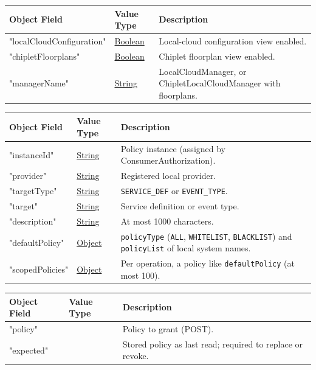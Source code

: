 \documentclass[a4paper]{arrowhead}
\newcommand{\mref}[2][]{{\textcolor{ArrowheadPurple}{\hyperref[sec:model:#2]{\ifstrempty{#1}{#2}{#1}}}}}
\newcommand{\pref}[1]{{\textcolor{ArrowheadGrey}{\hyperref[sec:model:primitives:#1]{#1}}}}
\begin{document}

\noindent\begin{tabularx}{\textwidth}{| >{\raggedright\arraybackslash}p{3.9cm} | >{\raggedright\arraybackslash\small}p{5.3cm} | X |} \hline
\rowcolor{gray!33} Object Field & Value Type & Description \\ \hline
"localCloudConfiguration" & \pref{Boolean} & Local-cloud configuration view enabled. \\ \hline
"chipletFloorplans" & \pref{Boolean} & Chiplet floorplan view enabled. \\ \hline
"managerName" & \pref{String} & LocalCloudManager, or ChipletLocalCloudManager with floorplans. \\ \hline
\end{tabularx}



\noindent\begin{tabularx}{\textwidth}{| >{\raggedright\arraybackslash}p{3.9cm} | >{\raggedright\arraybackslash\small}p{5.3cm} | X |} \hline
\rowcolor{gray!33} Object Field & Value Type & Description \\ \hline
"instanceId" & \pref{String} & Policy instance (assigned by Consumer\allowbreak{}Authorization). \\ \hline
"provider" & \pref{String} & Registered local provider. \\ \hline
"targetType" & \pref{String} & \texttt{SERVICE\_DEF} or \texttt{EVENT\_TYPE}. \\ \hline
"target" & \pref{String} & Service definition or event type. \\ \hline
"description" & \pref{String} & At most 1000 characters. \\ \hline
"defaultPolicy" & \pref{Object} & \texttt{policyType} (\texttt{ALL}, \texttt{WHITELIST}, \texttt{BLACKLIST}) and \texttt{policyList} of local system names. \\ \hline
"scopedPolicies" & \pref{Object} & Per operation, a policy like \texttt{defaultPolicy} (at most 100). \\ \hline
\end{tabularx}



\noindent\begin{tabularx}{\textwidth}{| >{\raggedright\arraybackslash}p{3.9cm} | >{\raggedright\arraybackslash\small}p{5.3cm} | X |} \hline
\rowcolor{gray!33} Object Field & Value Type & Description \\ \hline
"policy" & \mref{ManagementPolicy} & Policy to grant (POST). \\ \hline
"expected" & \mref{ManagementPolicy} & Stored policy as last read; required to replace or revoke. \\ \hline
\end{tabularx}
\end{document}
